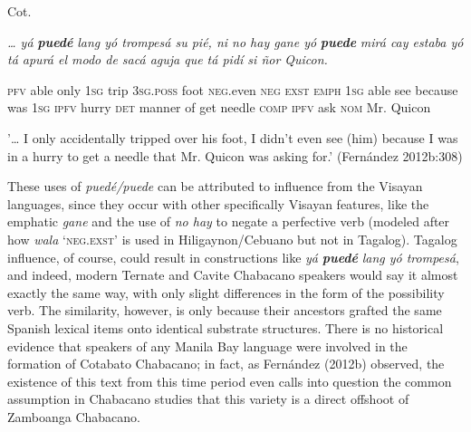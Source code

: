 \setcounter{listWWNumiileveli}{0}
\begin{listWWNumiileveli}
\item 
\begin{stylelsLanginfo}
\label{bkm:Ref53168856}Cot.
\end{stylelsLanginfo}
\end{listWWNumiileveli}
\begin{stylelsLanginfo}
\textit{… yá }\textbf{\textit{puedé}}\textit{ lang yó trompesá su pié, ni no hay gane yó }\textbf{\textit{puede}}\textit{ mirá cay estaba yó tá apurá el modo de sacá aguja que tá pidí si ñor Quicon.}
\end{stylelsLanginfo}

\begin{styleListParagraph}
\textsc{pfv} able only 1\textsc{sg} trip 3\textsc{sg.poss} foot \textsc{neg}.even \textsc{neg exst emph} 1\textsc{sg }able see because was 1\textsc{sg} \textsc{ipfv} hurry \textsc{det} manner of get needle \textsc{comp ipfv }ask\textsc{ nom }Mr. Quicon
\end{styleListParagraph}

\begin{styleStandard}
{}'… I only accidentally tripped over his foot, I didn't even see (him) because I was in a hurry to get a needle that Mr. Quicon was asking for.' (Fernández 2012b:308)
\end{styleStandard}

\begin{styleStandard}
These uses of \textit{puedé/puede }can be attributed to influence from the Visayan languages, since they occur with other specifically Visayan features, like the emphatic \textit{gane} and the use of \textit{no hay} to negate a perfective verb (modeled after how \textit{wala} ‘\textsc{neg.exst}’ is used in Hiligaynon/Cebuano but not in Tagalog). Tagalog influence, of course, could result in constructions like \textit{yá }\textbf{\textit{puedé}}\textit{ lang yó trompesá}, and indeed, modern Ternate and Cavite Chabacano speakers would say it almost exactly the same way, with only slight differences in the form of the possibility verb. The similarity, however, is only because their ancestors grafted the same Spanish lexical items onto identical substrate structures. There is no historical evidence that speakers of any Manila Bay language were involved in the formation of Cotabato Chabacano; in fact, as Fernández (2012b) observed, the existence of this text from this time period even calls into question the common assumption in Chabacano studies that this variety is a direct offshoot of Zamboanga Chabacano. \ 
\end{styleStandard}


